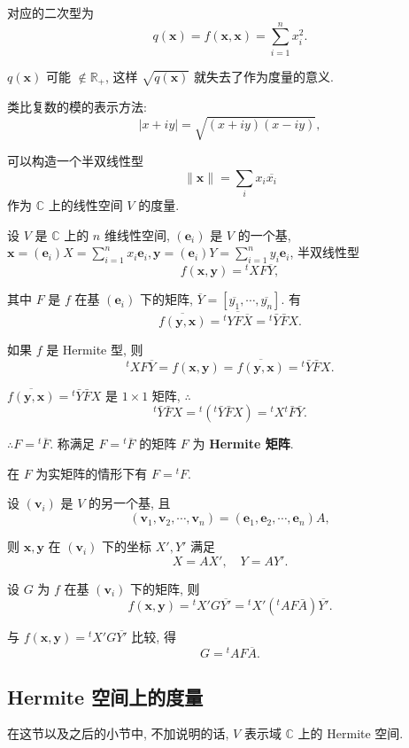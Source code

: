 \documentclass[color=black,device=normal,lang=cn,mode=geye]{elegantnote}
\begin{document}
对应的二次型为
\[q(\boldsymbol{x})=f(\boldsymbol{x},\boldsymbol{x})=\sum\limits_{i=1}^nx_i^2.\]

$q(\boldsymbol{x})$ 可能 $\notin\mathbb{R}_+$, 这样 $\sqrt{q(\boldsymbol{x})}$ 就失去了作为度量的意义.

类比复数的模的表示方法:
\[|x+iy|=\sqrt{(x+iy)(x-iy)},\]

可以构造一个半双线性型
\[\|\boldsymbol{x}\|=\sum\limits_ix_i\overline{x_i}\]
作为 $\mathbb{C}$ 上的线性空间 $V$ 的度量.

设 $V$ 是 $\mathbb{C}$ 上的 $n$ 维线性空间, $(\boldsymbol{e}_i)$ 是 $V$ 的一个基, $\boldsymbol{x}=(\boldsymbol{e}_i)X=\sum\limits_{i=1}^nx_i\boldsymbol{e}_i,\boldsymbol{y}=(\boldsymbol{e}_i)Y=\sum\limits_{i=1}^ny_i\boldsymbol{e}_i$, 半双线性型
\[f(\boldsymbol{x},\boldsymbol{y})={}^tXF\overline{Y},\]

其中 $F$ 是 $f$ 在基 $(\boldsymbol{e}_i)$ 下的矩阵, $\overline{Y}=[\overline{y_1},\cdots,\overline{y_n}]$. 有
\[\overline{f(\boldsymbol{y},\boldsymbol{x})}=\overline{{}^tYF\overline{X}}={}^t\bar{Y}\bar{F}X.\]

如果 $f$ 是 Hermite 型, 则
\[{}^tXF\overline{Y}=f(\boldsymbol{x},\boldsymbol{y})=\overline{f(\boldsymbol{y},\boldsymbol{x})}={}^t\bar{Y}\bar{F}X.\]

$\overline{f(\boldsymbol{y},\boldsymbol{x})}={}^t\bar{Y}\bar{F}X$ 是 $1\times 1$ 矩阵, $\therefore$
\[{}^t\bar{Y}\bar{F}X={}^t({}^t\bar{Y}\bar{F}X)={}^tX{}^t\bar{F}\bar{Y}.\]

$\therefore F={}^t\overline{F}$. 称满足 $F={}^t\overline{F}$ 的矩阵 $F$ 为 \textbf{Hermite 矩阵}.

在 $F$ 为实矩阵的情形下有 $F={}^tF$.

设 $(\boldsymbol{v}_i)$ 是 $V$ 的另一个基, 且
\[(\boldsymbol{v}_1,\boldsymbol{v}_2,\cdots,\boldsymbol{v}_n)=(\boldsymbol{e}_1,\boldsymbol{e}_2,\cdots,\boldsymbol{e}_n)A,\]

则 $\boldsymbol{x},\boldsymbol{y}$ 在 $(\boldsymbol{v}_i)$ 下的坐标 $X',Y'$ 满足
\[X=AX',\quad Y=AY'.\]

设 $G$ 为 $f$ 在基 $(\boldsymbol{v}_i)$ 下的矩阵, 则
\[f(\boldsymbol{x},\boldsymbol{y})={}^tX'G\overline{Y'}={}^tX'({}^tAF\bar{A})\overline{Y'}.\]

与 $f(\boldsymbol{x},\boldsymbol{y})={}^tX'G\overline{Y'}$ 比较, 得
\begin{equation}\label{eq2.1}
    G={}^tAF\overline{A}.
\end{equation}
\subsection{Hermite 空间上的度量}
在这节以及之后的小节中, 不加说明的话, $V$ 表示域 $\mathbb{C}$ 上的 Hermite 空间.
\end{document}
